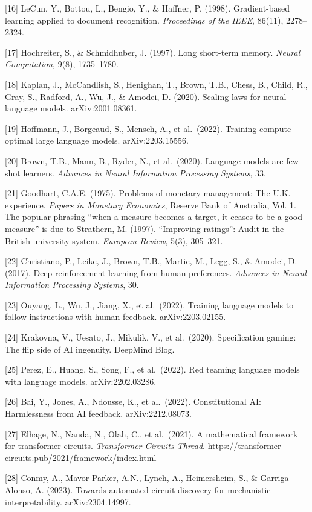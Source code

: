 \documentclass[
  11pt,
  letterpaper,
]{article}
\begin{document}
{[}16{]} LeCun, Y., Bottou, L., Bengio, Y., \& Haffner, P. (1998).
Gradient-based learning applied to document recognition.
\emph{Proceedings of the IEEE}, 86(11), 2278--2324.

{[}17{]} Hochreiter, S., \& Schmidhuber, J. (1997). Long short-term
memory. \emph{Neural Computation}, 9(8), 1735--1780.

{[}18{]} Kaplan, J., McCandlish, S., Henighan, T., Brown, T.B., Chess,
B., Child, R., Gray, S., Radford, A., Wu, J., \& Amodei, D. (2020).
Scaling laws for neural language models. arXiv:2001.08361.

{[}19{]} Hoffmann, J., Borgeaud, S., Mensch, A., et al.~(2022). Training
compute-optimal large language models. arXiv:2203.15556.

{[}20{]} Brown, T.B., Mann, B., Ryder, N., et al.~(2020). Language
models are few-shot learners. \emph{Advances in Neural Information
Processing Systems}, 33.

{[}21{]} Goodhart, C.A.E. (1975). Problems of monetary management: The
U.K. experience. \emph{Papers in Monetary Economics}, Reserve Bank of
Australia, Vol. 1. The popular phrasing ``when a measure becomes a
target, it ceases to be a good measure'' is due to Strathern, M. (1997).
``Improving ratings'': Audit in the British university system.
\emph{European Review}, 5(3), 305--321.

{[}22{]} Christiano, P., Leike, J., Brown, T.B., Martic, M., Legg, S.,
\& Amodei, D. (2017). Deep reinforcement learning from human
preferences. \emph{Advances in Neural Information Processing Systems},
30.

{[}23{]} Ouyang, L., Wu, J., Jiang, X., et al.~(2022). Training language
models to follow instructions with human feedback. arXiv:2203.02155.

{[}24{]} Krakovna, V., Uesato, J., Mikulik, V., et al.~(2020).
Specification gaming: The flip side of AI ingenuity. DeepMind Blog.

{[}25{]} Perez, E., Huang, S., Song, F., et al.~(2022). Red teaming
language models with language models. arXiv:2202.03286.

{[}26{]} Bai, Y., Jones, A., Ndousse, K., et al.~(2022). Constitutional
AI: Harmlessness from AI feedback. arXiv:2212.08073.

{[}27{]} Elhage, N., Nanda, N., Olah, C., et al.~(2021). A mathematical
framework for transformer circuits. \emph{Transformer Circuits Thread}.
https://transformer-circuits.pub/2021/framework/index.html

{[}28{]} Conmy, A., Mavor-Parker, A.N., Lynch, A., Heimersheim, S., \&
Garriga-Alonso, A. (2023). Towards automated circuit discovery for
mechanistic interpretability. arXiv:2304.14997.
\end{document}
